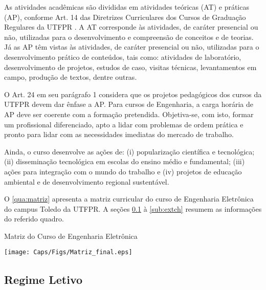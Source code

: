 As atividades acadêmicas são divididas em atividades teóricas (AT) e práticas (AP), conforme Art. 14 das Diretrizes Curriculares dos Cursos de Graduação Regulares da UTFPR \cite{cogep90}. A AT corresponde às atividades, de caráter presencial ou não, utilizadas para o desenvolvimento e compreensão de conceitos e de teorias. Já as AP têm vistas às atividades, de caráter presencial ou não, utilizadas para o desenvolvimento prático de conteúdos, tais como: atividades de laboratório, desenvolvimento de projetos, estudos de caso, visitas técnicas, levantamentos em campo, produção de textos, dentre outras.

O Art. 24 em seu parágrafo 1\textordmasculine{} considera que os projetos pedagógicos dos cursos da UTFPR devem dar ênfase a AP. Para cursos de Engenharia, a carga horária de AP deve ser coerente com a formação pretendida. Objetiva-se, com isto, formar um profissional diferenciado, apto a lidar com problemas de ordem prática e pronto para lidar com as necessidades imediatas do mercado de trabalho.

Ainda, o curso desenvolve as ações de: (i) popularização científica e tecnológica; (ii) disseminação tecnológica em escolas do ensino médio e fundamental; (iii) ações para integração com o mundo do trabalho e (iv) projetos de educação ambiental e de desenvolvimento regional sustentável.

O \autoref{qua:matriz} apresenta a matriz curricular do curso de Engenharia Eletrônica do campus Toledo da UTFPR. %
A seções \ref{sub:reg} à \ref{sub:extch} resumem as informações do referido quadro.

\begin{landscape}
	\begin{quadro}
		\centering
		\caption{Matriz do Curso de Engenharia Eletrônica}
		\texttt{[image: Caps/Figs/Matriz\_final.eps]}
		\fonte{\utf}
		\label{qua:matriz}
	\end{quadro}
\end{landscape}
\restoregeometry

\subsection{Regime Letivo}
\label{sub:reg}

